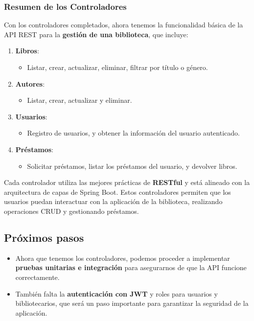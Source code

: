 \documentclass[11pt]{article}
\begin{document}
\subsubsection{Resumen de los Controladores}
\label{sec:orge586bbf}
Con los controladores completados, ahora tenemos la funcionalidad básica de la API REST para la \textbf{\textbf{gestión de una biblioteca}}, que incluye:
\begin{enumerate}
\item \textbf{\textbf{Libros}}:
\begin{itemize}
\item Listar, crear, actualizar, eliminar, filtrar por título o género.
\end{itemize}
\item \textbf{\textbf{Autores}}:
\begin{itemize}
\item Listar, crear, actualizar y eliminar.
\end{itemize}
\item \textbf{\textbf{Usuarios}}:
\begin{itemize}
\item Registro de usuarios, y obtener la información del usuario autenticado.
\end{itemize}
\item \textbf{\textbf{Préstamos}}:
\begin{itemize}
\item Solicitar préstamos, listar los préstamos del usuario, y devolver libros.
\end{itemize}
\end{enumerate}

Cada controlador utiliza las mejores prácticas de \textbf{\textbf{RESTful}} y está alineado con la arquitectura de capas de Spring Boot. Estos controladores permiten que los usuarios puedan interactuar con la aplicación de la biblioteca, realizando operaciones CRUD y gestionando préstamos.

\subsection{Próximos pasos}
\label{sec:org094eaa8}
\begin{itemize}
\item Ahora que tenemos los controladores, podemos proceder a implementar \textbf{\textbf{pruebas unitarias e integración}} para asegurarnos de que la API funcione correctamente.
\item También falta la \textbf{\textbf{autenticación con JWT}} y roles para usuarios y bibliotecarios, que será un paso importante para garantizar la seguridad de la aplicación.
\end{itemize}
\end{document}
